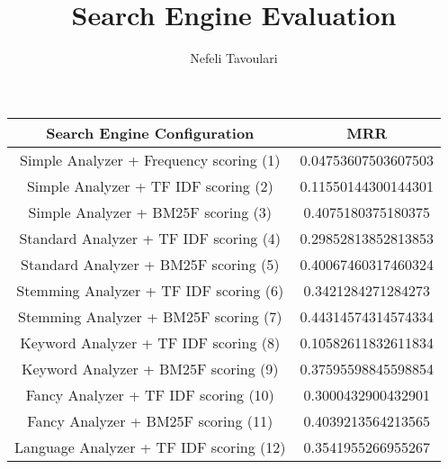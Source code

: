 \documentclass{article}
\title{Search Engine Evaluation}
\author{Nefeli Tavoulari}
\begin{document}
\maketitle

\section{}
    \begin{table}[h!]
    \centering
    \begin{tabular}{||c || c||} 
    \hline

    Search Engine Configuration &  MRR \\ [0.8ex] 
    \hline\hline
    Simple Analyzer + Frequency scoring (1) &  0.04753607503607503\\
    Simple Analyzer + TF IDF scoring (2) &  0.11550144300144301\\ 
    Simple Analyzer + BM25F scoring (3)  &  0.4075180375180375\\ 
    Standard Analyzer + TF IDF scoring (4) & 0.29852813852813853 \\
    Standard Analyzer + BM25F scoring (5) & 0.40067460317460324 \\
    Stemming Analyzer + TF IDF scoring (6) & 0.3421284271284273 \\
    Stemming Analyzer + BM25F scoring (7) & 0.44314574314574334 \\
    Keyword Analyzer + TF IDF scoring (8) & 0.10582611832611834 \\
    Keyword Analyzer + BM25F scoring (9) & 0.37595598845598854 \\
    Fancy Analyzer + TF IDF scoring (10) & 0.3000432900432901 \\
    Fancy Analyzer + BM25F scoring (11) & 0.4039213564213565 \\
    Language Analyzer + TF IDF scoring (12) & 0.3541955266955267 \\ 
     \hline
    \end{tabular}
    \end{table}
\end{document}
